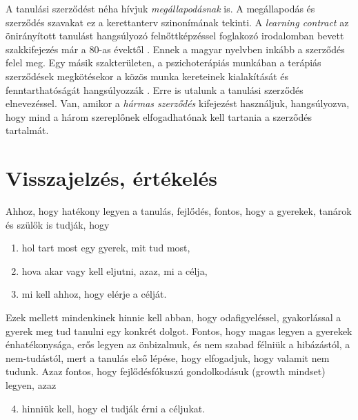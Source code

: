 A tanulási szerződést néha hívjuk \emph{megállapodásnak} is. A megállapodás és
szerződés szavakat ez a kerettanterv szinonímának tekinti. A \emph{learn\-ing
      con\-tract} az önirányított tanulást hangsúlyozó felnőttképzéssel
foglakozó
irodalomban
bevett szakkifejezés már a 80-as évektől \citep{Malcolm77}. Ennek a magyar
nyelvben inkább a szerződés felel meg. Egy másik szakterületen, a
pszichoterápiás munkában a terápiás szerződések megkötésekor a közös munka
kereteinek kialakítását és fenntarthatóságát hangsúlyozzák
\citep{pszichoterapia}. Erre is utalunk a tanulási szerződés elnevezéssel. Van,
amikor a \emph{hármas szerződés} kifejezést használjuk, hangsúlyozva, hogy mind
a három szereplőnek elfogadhatónak kell tartania a szerződés tartalmát.

\section{Visszajelzés, értékelés}
\label{sec:ertekeles}
Ahhoz, hogy hatékony legyen a tanulás, fejlődés, fontos, hogy a gyerekek,
tanárok és szülők is tudják, hogy
\begin{enumerate}
      \item hol tart most egy gyerek, mit tud most,
      \item hova akar vagy kell eljutni, azaz, mi a célja,
      \item mi kell ahhoz, hogy elérje a célját.
\end{enumerate}
Ezek mellett mindenkinek hinnie kell abban, hogy odafigyeléssel, gyakorlással a
gyerek meg tud tanulni egy konkrét dolgot. Fontos, hogy magas legyen a gyerekek
énhatékonysága,  erős legyen az önbizalmuk, és nem szabad félniük a hibázástól,
a nem-tudástól,
mert a tanulás első lépése, hogy elfogadjuk, hogy valamit nem tudunk. Azaz
fontos, hogy fejlődésfókuszú gondolkodásuk (growth mindset)
\citep{growthmindset} legyen, azaz
\begin{enumerate}
      \setcounter{enumi}{3}
      \item hinniük kell, hogy el tudják érni a céljukat.
\end{enumerate}

